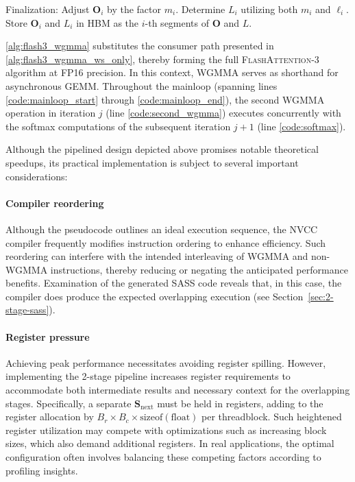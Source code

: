 \begin{algorithm}[H]
\begin{algorithmic}[1]
\STATE Finalization: Adjust $\mathbf{O}_{i}$ by the factor $m_{i}$. Determine $L_{i}$ utilizing both $m_{i}$ and $\ell_{i}$.
Store $\mathbf{O}_{i}$ and $L_{i}$ in HBM as the $i$-th segments of $\mathbf{O}$ and $L$.

\cref{alg:flash3_wgmma} substitutes the consumer path presented in \cref{alg:flash3_wgmma_ws_only}, thereby forming the full \textsc{FlashAttention-3} algorithm at FP16 precision. In this context, WGMMA serves as shorthand for asynchronous GEMM. Throughout the mainloop (spanning lines \ref{code:mainloop_start} through \ref{code:mainloop_end}), the second WGMMA operation in iteration $j$ (line \ref{code:second_wgmma}) executes concurrently with the softmax computations of the subsequent iteration $j+1$ (line \ref{code:softmax}).

Although the pipelined design depicted above promises notable theoretical speedups, its practical implementation is subject to several important considerations:

\paragraph{Compiler reordering} Although the pseudocode outlines an ideal execution sequence, the NVCC compiler frequently modifies instruction ordering to enhance efficiency. Such reordering can interfere with the intended interleaving of WGMMA and non-WGMMA instructions, thereby reducing or negating the anticipated performance benefits. Examination of the generated SASS code reveals that, in this case, the compiler does produce the expected overlapping execution (see Section~\ref{sec:2-stage-sass}).

\paragraph{Register pressure} Achieving peak performance necessitates avoiding register spilling. However, implementing the 2-stage pipeline increases register requirements to accommodate both intermediate results and necessary context for the overlapping stages. Specifically, a separate $\mathbf{S}_{\mathrm{next}}$ must be held in registers, adding to the register allocation by $B_r \times B_c \times \text{sizeof}(\text{float})$ per threadblock. Such heightened register utilization may compete with optimizations such as increasing block sizes, which also demand additional registers. In real applications, the optimal configuration often involves balancing these competing factors according to profiling insights.


\end{algorithmic}
\end{algorithm}
